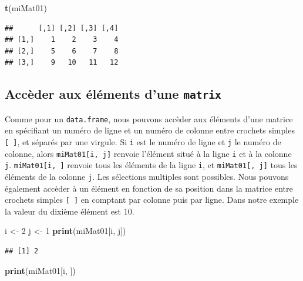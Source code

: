 \documentclass[]{book}
\newenvironment{Shaded}{\begin{snugshade}}{\end{snugshade}}
\newcommand{\DecValTok}[1]{\textcolor[rgb]{0.00,0.00,0.81}{#1}}
\newcommand{\KeywordTok}[1]{\textcolor[rgb]{0.13,0.29,0.53}{\textbf{#1}}}
\newcommand{\NormalTok}[1]{#1}
\newcommand{\StringTok}[1]{\textcolor[rgb]{0.31,0.60,0.02}{#1}}
\begin{document}
\begin{Shaded}
\begin{Highlighting}[]
\KeywordTok{t}\NormalTok{(miMat01)}
\end{Highlighting}
\end{Shaded}

\begin{verbatim}
##      [,1] [,2] [,3] [,4]
## [1,]    1    2    3    4
## [2,]    5    6    7    8
## [3,]    9   10   11   12
\end{verbatim}

\hypertarget{acceder-aux-elements-dune-matrix}{%
\subsection{\texorpdfstring{Accèder aux éléments d'une \texttt{matrix}}{Accèder aux éléments d'une matrix}}\label{acceder-aux-elements-dune-matrix}}

Comme pour un \texttt{data.frame}, nous pouvons accèder aux éléments d'une matrice en spécifiant un numéro de ligne et un numéro de colonne entre crochets simples \texttt{{[}\ {]}}, et séparés par une virgule. Si \texttt{i} est le numéro de ligne et \texttt{j} le numéro de colonne, alors \texttt{miMat01{[}i,\ j{]}} renvoie l'élément situé à la ligne \texttt{i} et à la colonne \texttt{j}. \texttt{miMat01{[}i,\ {]}} renvoie tous les éléments de la ligne \texttt{i}, et \texttt{miMat01{[},\ j{]}} tous les éléments de la colonne \texttt{j}. Les sélections multiples sont possibles. Nous pouvons également accèder à un élément en fonction de sa position dans la matrice entre crochets simples \texttt{{[}\ {]}} en comptant par colonne puis par ligne. Dans notre exemple la valeur du dixième élément est 10.

\begin{Shaded}
\begin{Highlighting}[]
\NormalTok{i <-}\StringTok{ }\DecValTok{2}
\NormalTok{j <-}\StringTok{ }\DecValTok{1}
\KeywordTok{print}\NormalTok{(miMat01[i, j])}
\end{Highlighting}
\end{Shaded}

\begin{verbatim}
## [1] 2
\end{verbatim}

\begin{Shaded}
\begin{Highlighting}[]
\KeywordTok{print}\NormalTok{(miMat01[i, ])}
\end{Highlighting}
\end{Shaded}
\end{document}
